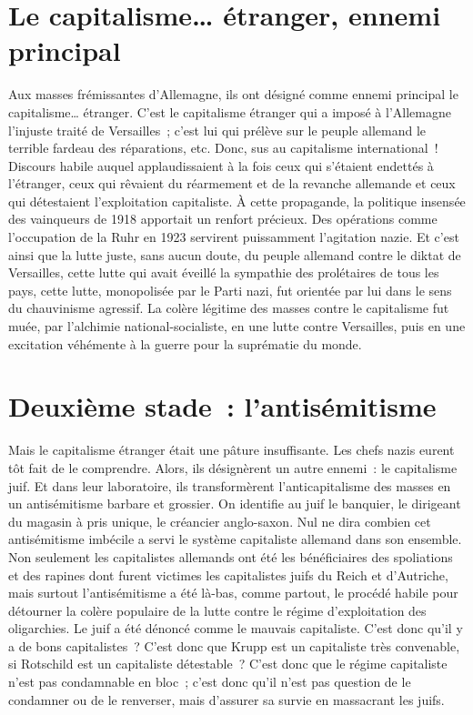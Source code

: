 \documentclass[french,twoside]{book} %
\begin{document}
\section[Le capitalisme… étranger, ennemi principal]{Le capitalisme… étranger, ennemi principal}
\noindent Aux masses frémissantes d’Allemagne, ils ont désigné comme ennemi principal le capitalisme… étranger. C’est le capitalisme étranger qui a imposé à l’Allemagne l’injuste traité de Versailles ; c’est lui qui prélève sur le peuple allemand le terrible fardeau des réparations, etc. Donc, sus au capitalisme international ! Discours habile auquel applaudissaient à la fois ceux qui s’étaient endettés à l’étranger, ceux qui rêvaient du réarmement et de la revanche allemande et ceux qui détestaient l’exploitation capitaliste. À cette propagande, la politique insensée des vainqueurs de 1918 apportait un renfort précieux. Des opérations comme l’occupation de la Ruhr en 1923 servirent puissamment l’agitation nazie. Et c’est ainsi que la lutte juste, sans aucun doute, du peuple allemand contre le diktat de Versailles, cette lutte qui avait éveillé la sympathie des prolétaires de tous les pays, cette lutte, monopolisée par le Parti nazi, fut orientée par lui dans le sens du chauvinisme agressif. La colère légitime des masses contre le capitalisme fut muée, par l’alchimie national-socialiste, en une lutte contre Versailles, puis en une excitation véhémente à la guerre pour la suprématie du monde.
\section[Deuxième stade : l’antisémitisme]{Deuxième stade : l’antisémitisme}
\noindent Mais le capitalisme étranger était une pâture insuffisante. Les chefs nazis eurent tôt fait de le comprendre. Alors, ils désignèrent un autre ennemi : le capitalisme juif. Et dans leur laboratoire, ils transformèrent l’anticapitalisme des masses en un antisémitisme barbare et grossier. On identifie au juif le banquier, le dirigeant du magasin à pris unique, le créancier anglo-saxon. Nul ne dira combien cet antisémitisme imbécile a servi le système capitaliste allemand dans son ensemble. Non seulement les capitalistes allemands ont été les bénéficiaires des spoliations et des rapines dont furent victimes les capitalistes juifs du Reich et d’Autriche, mais surtout l’antisémitisme a été là-bas, comme partout, le procédé habile pour détourner la colère populaire de la lutte contre le régime d’exploitation des oligarchies. Le juif a été dénoncé comme le mauvais capitaliste. C’est donc qu’il y a de bons capitalistes ? C’est donc que Krupp est un capitaliste très convenable, si Rotschild est un capitaliste détestable ? C’est donc que le régime capitaliste n’est pas condamnable en bloc ; c’est donc qu’il n’est pas question de le condamner ou de le renverser, mais d’assurer sa survie en massacrant les juifs.
\end{document}
